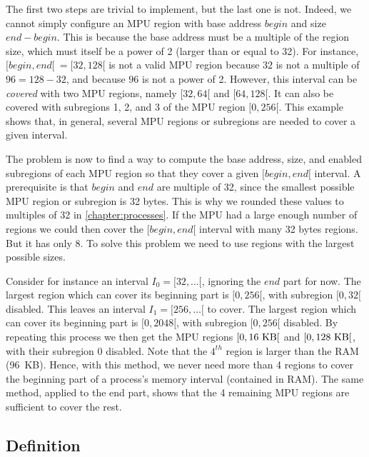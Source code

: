 The first two steps are trivial to implement, but the last one is not. Indeed,
we cannot simply configure an MPU region with base address $\mathit{begin}$ and
size $\mathit{end}-\mathit{begin}$. This is because the base address must be a
multiple of the region size, which must itself be a power of 2 (larger than or
equal to 32). For instance, $[\mathit{begin},\mathit{end}[\ = [32,128[$ is not
a valid MPU region because $32$ is not a multiple of $96=128-32$, and because
$96$ is not a power of 2. However, this interval can be {\em covered} with two
MPU regions, namely $[32,64[$ and $[64,128[$. It can also be covered with
subregions 1, 2, and 3 of the MPU region $[0,256[$. This example shows that, in
general, several MPU regions or subregions are needed to cover a given interval.

The problem is now to find a way to compute the base address, size, and enabled
subregions of each MPU region so that they cover a given
$[\mathit{begin},\mathit{end}[$ interval. A prerequisite is that ${begin}$ and
$\mathit{end}$ are multiple of 32, since the smallest possible MPU region or
subregion is 32 bytes. This is why we rounded these values to multiples of 32
in \cref{chapter:processes}. If the MPU had a large enough number of regions we
could then cover the $[\mathit{begin},\mathit{end}[$ interval with many 32
bytes regions. But it has only 8. To solve this problem we need to use regions
with the largest possible sizes.

Consider for instance an interval $I_0=[32,\ldots[$, ignoring the
$\mathit{end}$ part for now. The largest region which can cover its beginning
part is $[0,256[$, with subregion $[0,32[$ disabled. This leaves an interval
$I_1=[256,\ldots[$ to cover. The largest region which can cover its beginning
part is $[0,2048[$, with subregion $[0,256[$ disabled. By repeating this
process we then get the MPU regions $[0,16~\rm{KB}[$ and $[0,128~\rm{KB}[$,
with their subregion 0 disabled. Note that the $4^{th}$ region is larger than
the RAM (96~KB). Hence, with this method, we never need more than 4 regions to
cover the beginning part of a process's memory interval (contained in RAM). The
same method, applied to the end part, shows that the 4 remaining MPU regions
are sufficient to cover the rest.

\subsection{Definition}\label{subsection:mpu-regions-algorithm}

